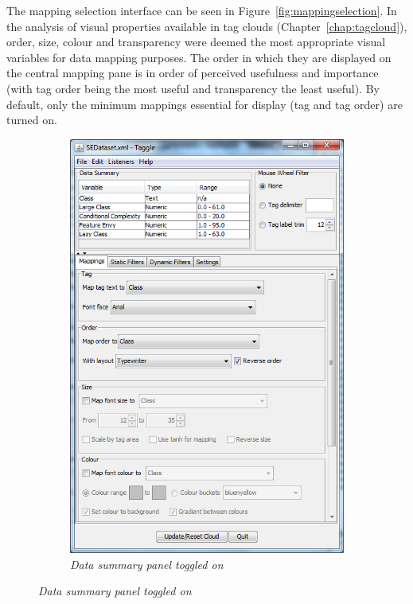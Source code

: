 The mapping selection interface can be seen in Figure~\vref{fig:mappingselection}. In the analysis of visual properties available in tag clouds (Chapter~\ref{chap:tagcloud}), order, size, colour and transparency were deemed the most appropriate visual variables for data mapping purposes. The order in which they are displayed on the central mapping pane is in order of perceived usefulness and importance (with tag order being the most useful and transparency the least useful). By default, only the minimum mappings essential for display (tag and tag order) are turned on.

\begin{figure}[!htb]
\begin{subfigure}{.5\textwidth}
	\centering
	\includegraphics[scale=0.40]{mappings1.png}
	\caption{\textit{Data summary panel toggled on}}
\end{subfigure}%

\end{figure}
